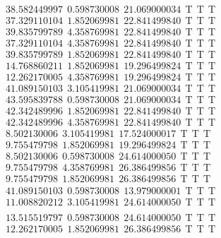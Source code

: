 \documentclass[10pt,a4paper]{article}
\begin{document}
\begin{itemize}
\begin{displaymath}
{\begin{aligned}
&38.582449997 ~~   0.598730008 ~~  21.069000034  ~~\mathrm{T  ~~ T  ~~ T } \\ 
&37.329110104 ~~   1.852069981 ~~  22.841499840  ~~\mathrm{T  ~~ T  ~~ T } \\ 
&39.835799789 ~~   4.358769981 ~~  22.841499840  ~~\mathrm{T  ~~ T  ~~ T } \\ 
&37.329110104 ~~   4.358769981 ~~  22.841499840  ~~\mathrm{T  ~~ T  ~~ T } \\ 
&39.835799789 ~~   1.852069981 ~~  22.841499840  ~~\mathrm{T  ~~ T  ~~ T } \\ 
&14.768860211 ~~   1.852069981 ~~  19.296499824  ~~\mathrm{T  ~~ T  ~~ T } \\
&12.262170005 ~~   4.358769981 ~~  19.296499824  ~~\mathrm{T  ~~ T  ~~ T } \\ 
&41.089150103 ~~   3.105419981 ~~  21.069000034  ~~\mathrm{T  ~~ T  ~~ T } \\ 
&43.595839788 ~~   0.598730008 ~~  21.069000034  ~~\mathrm{T  ~~ T  ~~ T } \\ 
&42.342489996 ~~   1.852069981 ~~  22.841499840  ~~\mathrm{T  ~~ T  ~~ T } \\ 
&42.342489996 ~~   4.358769981 ~~  22.841499840  ~~\mathrm{T  ~~ T  ~~ T } \\ 
& 8.502130006 ~~   3.105419981 ~~  17.524000017  ~~\mathrm{T  ~~ T  ~~ T } \\ 
& 9.755479798 ~~   1.852069981 ~~  19.296499824  ~~\mathrm{T  ~~ T  ~~ T } \\ 
& 8.502130006 ~~   0.598730008 ~~  24.614000050  ~~\mathrm{T  ~~ T  ~~ T } \\ 
& 9.755479798 ~~   4.358769981 ~~  26.386499856  ~~\mathrm{T  ~~ T  ~~ T } \\ 
& 9.755479798 ~~   1.852069981 ~~  26.386499856  ~~\mathrm{T  ~~ T  ~~ T } \\ 
&41.089150103 ~~   0.598730008 ~~  13.979000001  ~~\mathrm{T  ~~ T  ~~ T } \\ 
&11.008820212 ~~   3.105419981 ~~  24.614000050  ~~\mathrm{T  ~~ T  ~~ T } \\ 
				\end{aligned}
			}
		\end{displaymath}
		\begin{displaymath}
			\boxed{
				\begin{aligned}
&13.515519797 ~~   0.598730008 ~~  24.614000050  ~~\mathrm{T  ~~ T  ~~ T } \\ 
&12.262170005 ~~   1.852069981 ~~  26.386499856  ~~\mathrm{T  ~~ T  ~~ T } \\ 

\end{aligned}}
\end{displaymath}
\end{itemize}
\end{document}
